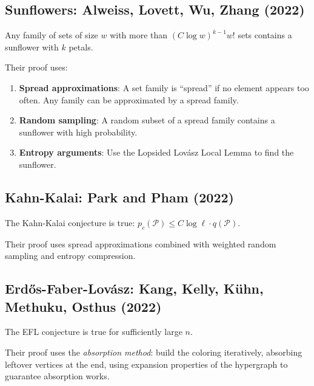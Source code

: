 \subsection{Sunflowers: Alweiss, Lovett, Wu, Zhang (2022)}

\begin{theorem}
Any family of sets of size $w$ with more than $(C \log w)^{k-1} w!$ sets contains a sunflower with $k$ petals.
\end{theorem}

Their proof uses:
\begin{enumerate}
\item \textbf{Spread approximations}: A set family is ``spread'' if no element appears too often. Any family can be approximated by a spread family.
\item \textbf{Random sampling}: A random subset of a spread family contains a sunflower with high probability.
\item \textbf{Entropy arguments}: Use the Lopsided Lov\'{a}sz Local Lemma to find the sunflower.
\end{enumerate}

\subsection{Kahn-Kalai: Park and Pham (2022)}

\begin{theorem}
The Kahn-Kalai conjecture is true: $p_c(\mathcal{P}) \le C \log \ell \cdot q(\mathcal{P})$.
\end{theorem}

Their proof uses spread approximations combined with weighted random sampling and entropy compression.

\subsection{Erd\H{o}s-Faber-Lov\'{a}sz: Kang, Kelly, K\"{u}hn, Methuku, Osthus (2022)}

\begin{theorem}
The EFL conjecture is true for sufficiently large $n$.
\end{theorem}

Their proof uses the \emph{absorption method}: build the coloring iteratively, absorbing leftover vertices at the end, using expansion properties of the hypergraph to guarantee absorption works.

